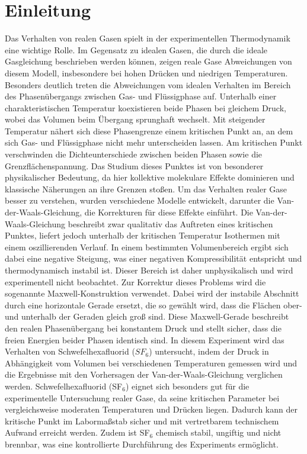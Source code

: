 \section{Einleitung}
\label{sec:Einleitung}

Das Verhalten von realen Gasen spielt in der experimentellen Thermodynamik eine wichtige Rolle.
Im Gegensatz zu idealen Gasen, die durch die ideale Gasgleichung beschrieben werden können,
zeigen reale Gase Abweichungen von diesem Modell, insbesondere bei hohen Drücken und niedrigen Temperaturen.
Besonders deutlich treten die Abweichungen vom idealen Verhalten
im Bereich des Phasenübergangs zwischen Gas- und Flüssigphase auf.
Unterhalb einer charakteristischen Temperatur koexistieren beide
Phasen bei gleichem Druck, wobei das Volumen beim Übergang sprunghaft
wechselt. Mit steigender Temperatur nähert sich diese Phasengrenze
einem kritischen Punkt an, an dem sich Gas- und Flüssigphase nicht
mehr unterscheiden lassen. Am kritischen Punkt verschwinden die
Dichteunterschiede zwischen beiden Phasen sowie die Grenzflächenspannung.
Das Studium dieses Punktes ist von besonderer physikalischer
Bedeutung, da hier kollektive molekulare Effekte dominieren und
klassische Näherungen an ihre Grenzen stoßen.
Um das Verhalten realer Gase besser zu verstehen, wurden verschiedene Modelle entwickelt, darunter die Van-der-Waals-Gleichung,
die Korrekturen für diese Effekte einführt.
Die Van-der-Waals-Gleichung beschreibt zwar qualitativ das Auftreten
eines kritischen Punktes, liefert jedoch unterhalb der kritischen
Temperatur Isothermen mit einem oszillierenden Verlauf. In einem
bestimmten Volumenbereich ergibt sich dabei eine negative Steigung,
was einer negativen Kompressibilität entspricht und thermodynamisch
instabil ist. Dieser Bereich ist daher unphysikalisch und wird
experimentell nicht beobachtet.
Zur Korrektur dieses Problems wird die sogenannte Maxwell-Konstruktion
verwendet. Dabei wird der instabile Abschnitt durch eine horizontale
Gerade ersetzt, die so gewählt wird, dass die Flächen ober- und
unterhalb der Geraden gleich groß sind. Diese Maxwell-Gerade beschreibt
den realen Phasenübergang bei konstantem Druck und stellt sicher,
dass die freien Energien beider Phasen identisch sind.
In diesem Experiment wird das Verhalten von Schwefelhexafluorid (\(SF_6\)) untersucht, indem der Druck in Abhängigkeit vom Volumen bei verschiedenen
Temperaturen gemessen wird und die Ergebnisse mit den Vorhersagen der Van-der-Waals-Gleichung verglichen werden.
Schwefelhexafluorid (SF$_6$) eignet sich besonders gut für die
experimentelle Untersuchung realer Gase, da seine kritischen
Parameter bei vergleichsweise moderaten Temperaturen und Drücken
liegen. Dadurch kann der kritische Punkt im Labormaßstab sicher
und mit vertretbarem technischem Aufwand erreicht werden.
Zudem ist SF$_6$ chemisch stabil, ungiftig und nicht brennbar,
was eine kontrollierte Durchführung des Experiments ermöglicht.